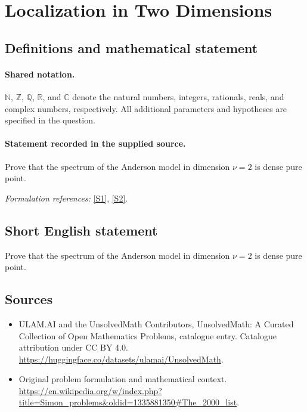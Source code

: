 \documentclass[11pt]{article}
\newcommand{\sref}[2]{\hyperlink{source:#1:#2}{[S#2]}}
\begin{document}
\section{Localization in Two Dimensions}\label{statement}

\subsection{Definitions and mathematical statement}

\paragraph{Shared notation.}$\mathbb N$, $\mathbb Z$, $\mathbb Q$, $\mathbb R$, and $\mathbb C$ denote the natural numbers, integers, rationals, reals, and complex numbers, respectively. All additional parameters and hypotheses are specified in the question.


\paragraph{Statement recorded in the supplied source.}
Prove that the spectrum of the Anderson model in dimension $\nu=2$ is dense pure point.
\par\smallskip\textit{Formulation references:} \sref{statement}{1}, \sref{statement}{2}.
\subsection{Short English statement}
Prove that the spectrum of the Anderson model in dimension $\nu=2$ is dense pure point.
\subsection{Sources}
\begin{itemize}
\item[\hypertarget{source:statement:1}{S1}] ULAM.AI and the UnsolvedMath Contributors, UnsolvedMath: A Curated Collection of Open Mathematics Problems, catalogue entry. Catalogue attribution under CC BY 4.0.
\url{https://huggingface.co/datasets/ulamai/UnsolvedMath}.
\item[\hypertarget{source:statement:2}{S2}] Original problem formulation and mathematical context.
\url{https://en.wikipedia.org/w/index.php?title=Simon_problems&oldid=1335881350#The_2000_list}.
\end{itemize}
\label{end:statement}
\end{document}
